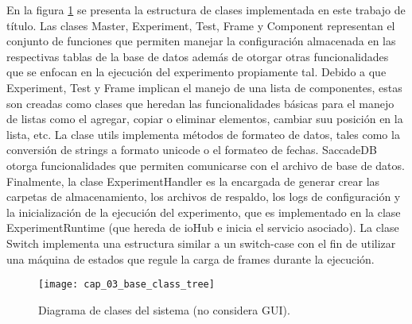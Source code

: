 \documentclass[\main/main.tex]{subfiles}
\begin{document}
		En la figura \ref{fig:03_base_class_tree} se presenta la estructura de clases implementada en este trabajo de título. Las clases Master, Experiment, Test, Frame y Component representan el conjunto de funciones que permiten manejar la configuración almacenada en las respectivas tablas de la base de datos además de otorgar otras funcionalidades que se enfocan en la ejecución del experimento propiamente tal. Debido a que Experiment, Test y Frame implican el manejo de una lista de componentes, estas son creadas como clases que heredan las funcionalidades básicas para el manejo de listas como el agregar, copiar o eliminar elementos, cambiar suu posición en la lista, etc. La clase utils implementa métodos de formateo de datos, tales como la conversión de strings a formato unicode o el formateo de fechas. SaccadeDB otorga funcionalidades que permiten comunicarse con el archivo de base de datos. Finalmente, la clase ExperimentHandler es la encargada de generar crear las carpetas de almacenamiento, los archivos de respaldo, los logs de configuración y la inicialización de la ejecución del experimento, que es implementado en la clase ExperimentRuntime (que hereda de ioHub e inicia el servicio asociado). La clase Switch implementa una estructura similar a un switch-case con el fin de utilizar una máquina de estados que regule la carga de frames durante la ejecución.  
		\begin{figure}[H]
			\centering
			\texttt{[image: cap\_03\_base\_class\_tree]}
			\caption{Diagrama de clases del sistema (no considera GUI).}
			\label{fig:03_base_class_tree}
		\end{figure} 
\end{document}
